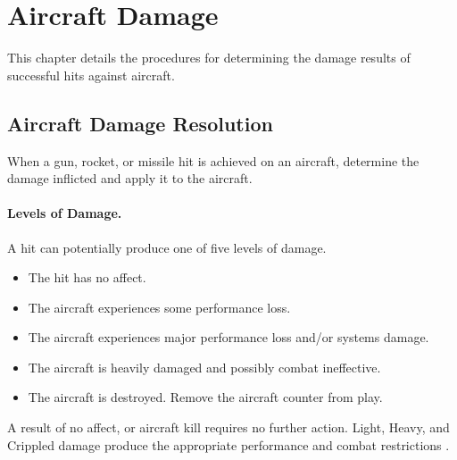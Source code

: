 \section{Aircraft Damage}

This chapter details the procedures for determining the damage results of successful hits against aircraft.

\subsection{Aircraft Damage Resolution}

When a gun, rocket, or missile hit is achieved on an aircraft, determine the damage inflicted and apply it to the aircraft.


\paragraph{Levels of Damage.} A hit can potentially produce one of five levels of damage.

\begin{itemize}

    \item{} The hit has no affect.

    \item{} The aircraft experiences some performance loss.
    
    \item{} The aircraft experiences major performance loss and/or systems damage.

    \item{} The aircraft is heavily damaged and possibly combat ineffective.
    
    \item{} The aircraft is destroyed. Remove the aircraft counter from play.

\end{itemize}

A result of no affect, or aircraft kill requires no further action. Light, Heavy, and Crippled damage produce the appropriate performance and combat restrictions .

